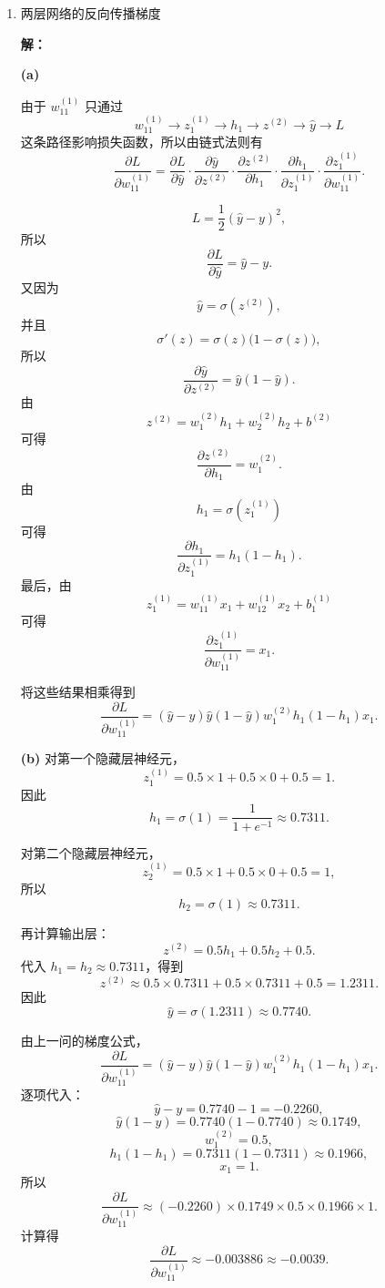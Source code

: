 \documentclass[a4paper]{article}
\newenvironment{solution}{\par\noindent\textbf{解：}\par}{\par}
\begin{document}
\begin{enumerate}
\begin{solution}
因此，该两层感知机的输出为
\[
\hat{y}=x_1\operatorname{XNOR}x_2,
\]
\end{solution}

\item 两层网络的反向传播梯度
\begin{solution}
\textbf{(a)}

由于 $w_{11}^{(1)}$ 只通过
\[
w_{11}^{(1)}\rightarrow z_1^{(1)}\rightarrow h_1\rightarrow z^{(2)}\rightarrow \hat{y}\rightarrow L
\]
这条路径影响损失函数，所以由链式法则有
\[
\frac{\partial L}{\partial w_{11}^{(1)}}
=
\frac{\partial L}{\partial \hat{y}}
\cdot
\frac{\partial \hat{y}}{\partial z^{(2)}}
\cdot
\frac{\partial z^{(2)}}{\partial h_1}
\cdot
\frac{\partial h_1}{\partial z_1^{(1)}}
\cdot
\frac{\partial z_1^{(1)}}{\partial w_{11}^{(1)}}.
\]

\[
L=\frac{1}{2}(\hat{y}-y)^2,
\]
所以
\[
\frac{\partial L}{\partial \hat{y}}
=
\hat{y}-y.
\]
又因为
\[
\hat{y}=\sigma(z^{(2)}),
\]
并且
\[
\sigma'(z)=\sigma(z)\bigl(1-\sigma(z)\bigr),
\]
所以
\[
\frac{\partial \hat{y}}{\partial z^{(2)}}
=
\hat{y}(1-\hat{y}).
\]
由
\[
z^{(2)}
=
w_1^{(2)}h_1+w_2^{(2)}h_2+b^{(2)}
\]
可得
\[
\frac{\partial z^{(2)}}{\partial h_1}
=
w_1^{(2)}.
\]
由
\[
h_1=\sigma(z_1^{(1)})
\]
可得
\[
\frac{\partial h_1}{\partial z_1^{(1)}}
=
h_1(1-h_1).
\]
最后，由
\[
z_1^{(1)}
=
w_{11}^{(1)}x_1+w_{12}^{(1)}x_2+b_1^{(1)}
\]
可得
\[
\frac{\partial z_1^{(1)}}{\partial w_{11}^{(1)}}
=
x_1.
\]

将这些结果相乘得到
\[
\frac{\partial L}{\partial w_{11}^{(1)}}
=
(\hat{y}-y)\hat{y}(1-\hat{y})w_1^{(2)}h_1(1-h_1)x_1.
\]


\textbf{(b)}
对第一个隐藏层神经元，
\[
z_1^{(1)}
=
0.5\times 1+0.5\times 0+0.5
=
1.
\]
因此
\[
h_1=\sigma(1)=\frac{1}{1+e^{-1}}\approx 0.7311.
\]

对第二个隐藏层神经元，
\[
z_2^{(1)}
=
0.5\times 1+0.5\times 0+0.5
=
1,
\]
所以
\[
h_2=\sigma(1)\approx 0.7311.
\]

再计算输出层：
\[
z^{(2)}
=
0.5h_1+0.5h_2+0.5.
\]
代入 $h_1=h_2\approx 0.7311$，得到
\[
z^{(2)}
\approx
0.5\times 0.7311+0.5\times 0.7311+0.5
=
1.2311.
\]
因此
\[
\hat{y}
=
\sigma(1.2311)
\approx 0.7740.
\]

由上一问的梯度公式，
\[
\frac{\partial L}{\partial w_{11}^{(1)}}
=
(\hat{y}-y)\hat{y}(1-\hat{y})w_1^{(2)}h_1(1-h_1)x_1.
\]
逐项代入：
\[
\hat{y}-y
=
0.7740-1
=
-0.2260,
\]
\[
\hat{y}(1-\hat{y})
=
0.7740(1-0.7740)
\approx 0.1749,
\]
\[
w_1^{(2)}=0.5,
\]
\[
h_1(1-h_1)
=
0.7311(1-0.7311)
\approx 0.1966,
\]
\[
x_1=1.
\]
所以
\[
\frac{\partial L}{\partial w_{11}^{(1)}}
\approx
(-0.2260)\times 0.1749\times 0.5\times 0.1966\times 1.
\]
计算得
\[
\frac{\partial L}{\partial w_{11}^{(1)}}
\approx -0.003886 \approx -0.0039.
\]

\end{solution}

\end{enumerate}
\end{document}
